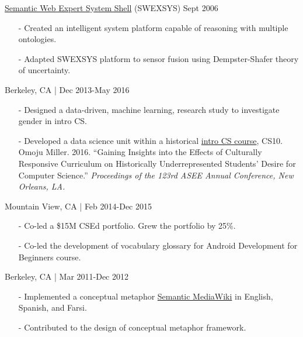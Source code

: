 \documentclass[10pt,article,oneside]{memoir}
\begin{document}
\ind \href{https://github.com/omoju/SWEXSYS}{Semantic Web Expert System Shell} (SWEXSYS) \hfill Sept 2006 
\begin{itemize}[noitemsep,nolistsep]
\item[-] Created an intelligent system platform capable of reasoning with multiple ontologies.
\item[-] Adapted SWEXSYS platform to sensor fusion using Dempster-Shafer theory of uncertainty.
\end{itemize} 

\bigskip


\medskip

 \hfill Berkeley, CA | Dec 2013-May 2016
\begin{itemize}[noitemsep,nolistsep]
\item[-] Designed a data-driven, machine learning, research study to investigate gender in intro CS. 
\item[-] Developed a data science unit within a historical \href{http://www.whitehouse.gov/the-press-office/2014/12/08/fact-sheet-new-commitments-support-computer-science-education}{intro CS course}, CS10.\\
\ind Omoju Miller. 2016. ``Gaining Insights into the Effects of Culturally Responsive Curriculum on Historically Underrepresented Students' Desire for Computer Science.'' \emph{Proceedings of the 123rd ASEE Annual Conference, New Orleans, LA.}

\end{itemize} 

 \hfill Mountain View, CA | Feb 2014-Dec 2015
\begin{itemize}[noitemsep,nolistsep]
\item[-]Co-led a \$15M CSEd portfolio. Grew the portfolio by 25\%.
\item[-]Co-led the development of vocabulary glossary for Android Development for Beginners course.
\end{itemize} 

 \hfill Berkeley, CA | Mar 2011-Dec 2012
\begin{itemize}[noitemsep,nolistsep]
\item[-] Implemented a conceptual metaphor \href{http://metaphor.icsi.berkeley.edu}{Semantic MediaWiki} in English, Spanish, and Farsi.
\item[-] Contributed to the design of conceptual metaphor framework.
\end{itemize} 
\end{document}
